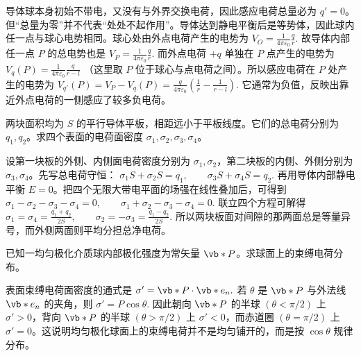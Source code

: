 \documentclass[lang=cn,11pt]{elegantbook}
\begin{document}
\begin{solution}
导体球本身初始不带电，又没有与外界交换电荷，因此感应电荷总量必为
\(\boxed{q'=0}\)。
但“总量为零”并不代表“处处不起作用”。导体达到静电平衡后是等势体，因此球内任一点与球心电势相同。球心处由外点电荷产生的电势为
 \(V_O=\frac{1}{4\pi\varepsilon_0}\frac{q}{r}.\) 
故导体内部任一点 \(P\) 的总电势也是
 \(V_P=\frac{1}{4\pi\varepsilon_0}\frac{q}{r}.\) 
而外点电荷 \(+q\) 单独在 \(P\) 点产生的电势为
 \(V_q(P)=\frac{1}{4\pi\varepsilon_0}\frac{q}{r-l}\) 
（这里取 \(P\) 位于球心与点电荷之间）。所以感应电荷在 \(P\) 处产生的电势为
 \(V_{q'}(P)=V_P-V_q(P) =\frac{q}{4\pi\varepsilon_0}\left(\frac{1}{r}-\frac{1}{r-l}\right).\) 
它通常为负值，反映出靠近外点电荷的一侧感应了较多负电荷。
\end{solution}

\begin{exercise}[两块已知总电荷的大平板各表面电荷密度]
两块面积均为 \(S\) 的平行导体平板，相距远小于平板线度。它们的总电荷分别为 \(q_1,q_2\)。求四个表面的电荷面密度 \(\sigma_1,\sigma_2,\sigma_3,\sigma_4\)。
\end{exercise}

\begin{solution}
设第一块板的外侧、内侧面电荷密度分别为 \(\sigma_1,\sigma_2\)，第二块板的内侧、外侧分别为 \(\sigma_3,\sigma_4\)。先写总电荷守恒：
 \(\sigma_1S+\sigma_2S=q_1, \qquad \sigma_3S+\sigma_4S=q_2.\) 
再用导体内部静电平衡 \(E=0\)。把四个无限大带电平面的场强在线性叠加后，可得到
 \(\sigma_1-\sigma_2-\sigma_3-\sigma_4=0, \qquad \sigma_1+\sigma_2-\sigma_3-\sigma_4=0.\) 
联立四个方程可解得
 \(\boxed{ \sigma_1=\sigma_4=\frac{q_1+q_2}{2S}, \qquad \sigma_2=-\sigma_3=\frac{q_1-q_2}{2S}. }\) 
所以两块板面对间隙的那两面总是等量异号，而外侧两面则平均分担总净电荷。
\end{solution}

\begin{exercise}[均匀极化介质球的束缚电荷分布]
已知一均匀极化介质球内部极化强度为常矢量 \(\vb*{P}\)。求球面上的束缚电荷分布。
\end{exercise}

\begin{solution}
表面束缚电荷面密度的通式是
 \(\sigma'=\vb*{P}\cdot \vb*{e}_n.\) 
若 \(\theta\) 是 \(\vb*{P}\) 与外法线 \(\vb*{e}_n\) 的夹角，则
 \(\boxed{\sigma'=P\cos\theta}.\) 
因此朝向 \(\vb*{P}\) 的半球 \((\theta<\pi/2)\) 上 \(\sigma'>0\)，背向 \(\vb*{P}\) 的半球 \((\theta>\pi/2)\) 上 \(\sigma'<0\)，而赤道圈 \((\theta=\pi/2)\) 上 \(\sigma'=0\)。这说明均匀极化球面上的束缚电荷并不是均匀铺开的，而是按 \(\cos\theta\) 规律分布。
\end{solution}
\end{document}
